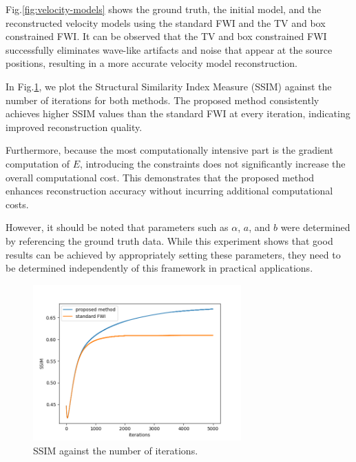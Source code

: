 Fig.\ref{fig:velocity-models} shows the ground truth, the initial model, and the reconstructed velocity models using the standard FWI and the TV and box constrained FWI.
It can be observed that the TV and box constrained FWI successfully eliminates wave-like artifacts and noise that appear at the source positions, resulting in a more accurate velocity model reconstruction.

In Fig.\ref{fig:ssim}, we plot the Structural Similarity Index Measure (SSIM) against the number of iterations for both methods.
The proposed method consistently achieves higher SSIM values than the standard FWI at every iteration, indicating improved reconstruction quality.

Furthermore, because the most computationally intensive part is the gradient computation of $E$, introducing the constraints does not significantly increase the overall computational cost.
This demonstrates that the proposed method enhances reconstruction accuracy without incurring additional computational costs.

However, it should be noted that parameters such as $\alpha$, $a$, and $b$ were determined by referencing the ground truth data.
While this experiment shows that good results can be achieved by appropriately setting these parameters, they need to be determined independently of this framework in practical applications.


\begin{figure}[htbp]
\vspace{-\baselineskip}
\begin{center}
    \includegraphics[width=80mm]{public/ssim}
    \caption{SSIM against the number of iterations.}
    \label{fig:ssim}
\end{center}
\vspace{-\baselineskip}
\end{figure}
